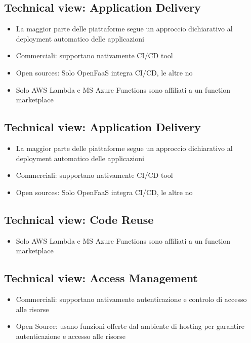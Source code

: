 \documentclass[a4paper, 12pt]{report}
\begin{document}
            \subsection{Technical view: Application Delivery}
            \begin{itemize}
              \item La maggior parte delle piattaforme segue un approccio dichiarativo al deployment automatico delle applicazioni
              \item Commerciali: supportano nativamente CI/CD tool
              \item Open sources: Solo OpenFaaS integra CI/CD, le altre no
            \end{itemize}
            \begin{itemize}
              \item Solo AWS Lambda e MS Azure Functions sono affiliati a un function marketplace
            \end{itemize}
            \subsection{Technical view: Application Delivery}
            \begin{itemize}
              \item La maggior parte delle piattaforme segue un approccio dichiarativo al deployment automatico delle applicazioni
              \item Commerciali: supportano nativamente CI/CD tool
              \item Open sources: Solo OpenFaaS integra CI/CD, le altre no
            \end{itemize}
            \subsection{Technical view: Code Reuse}
            \begin{itemize}
              \item Solo AWS Lambda e MS Azure Functions sono affiliati a un function marketplace
            \end{itemize}
            \subsection{Technical view: Access Management}
            \begin{itemize}
              \item Commerciali: supportano nativamente autenticazione e controlo di accesso alle risorse 
              \item Open Source: usano funzioni offerte dal ambiente di hosting per garantire autenticazione e accesso alle risorse
            \end{itemize}
            \clearpage
\end{document}

